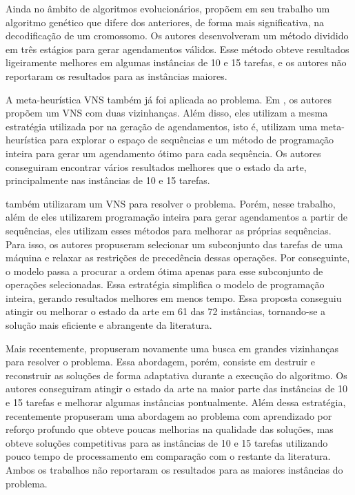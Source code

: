Ainda no âmbito de algoritmos evolucionários, \cite{yang2012improved} propõem em seu trabalho um algoritmo genético que difere dos anteriores, de forma mais significativa, na decodificação de um cromossomo. Os autores desenvolveram um método dividido em três estágios para gerar agendamentos válidos. Esse método obteve resultados ligeiramente melhores em algumas instâncias de 10 e 15 tarefas, e os autores não reportaram os resultados para as instâncias maiores.

A meta-heurística \ac{VNS} também já foi aplicada ao problema. Em \cite{wang2014variable}, os autores propõem um \ac{VNS} com duas vizinhanças. Além disso, eles utilizam a mesma estratégia utilizada por \cite{dos2010combination} na geração de agendamentos, isto é, utilizam uma meta-heurística para explorar o espaço de sequências e um método de programação inteira para gerar um agendamento ótimo para cada sequência. Os autores conseguiram encontrar vários resultados melhores que o estado da arte, principalmente nas instâncias de 10 e 15 tarefas. 

\cite{ahmadian2021meta} também utilizaram um \ac{VNS} para resolver o problema. Porém, nesse trabalho, além de eles utilizarem programação inteira para gerar agendamentos a partir de sequências, eles utilizam esses métodos para melhorar as próprias sequências. Para isso, os autores propuseram selecionar um subconjunto das tarefas de uma máquina e relaxar as restrições de precedência dessas operações. Por conseguinte, o modelo passa a procurar a ordem ótima apenas para esse subconjunto de operações selecionadas. Essa estratégia simplifica o modelo de programação inteira, gerando resultados melhores em menos tempo. Essa proposta conseguiu atingir ou melhorar o estado da arte em 61 das 72 instâncias, tornando-se a solução mais eficiente e abrangente da literatura. 

Mais recentemente, \cite{abderrazzak2022adaptive} propuseram novamente uma busca em grandes vizinhanças para resolver o problema. Essa abordagem, porém, consiste em destruir e reconstruir as soluções de forma adaptativa durante a execução do algoritmo. Os autores conseguiram atingir o estado da arte na maior parte das instâncias de 10 e 15 tarefas e melhorar algumas instâncias pontualmente. Além dessa estratégia, \cite{sabri2023reinforcement} recentemente propuseram uma abordagem ao problema com aprendizado por reforço profundo que obteve poucas melhorias na qualidade das soluções, mas obteve soluções competitivas para as instâncias de 10 e 15 tarefas utilizando pouco tempo de processamento em comparação com o restante da literatura. Ambos os trabalhos não reportaram os resultados para as maiores instâncias do problema.


